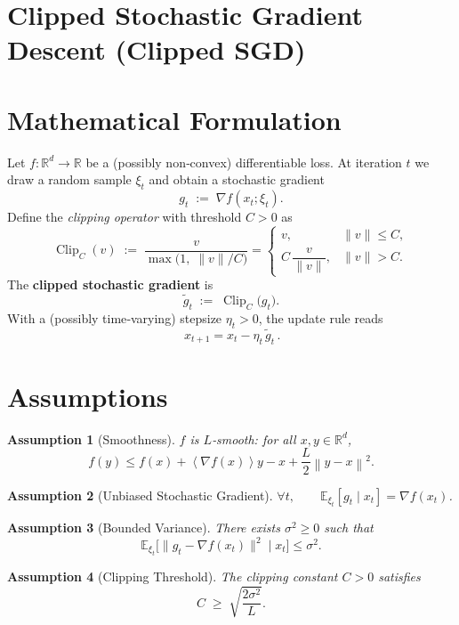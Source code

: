 \documentclass{article}
\newtheorem{assumption}{Assumption}
\newcommand{\E}{\mathbb{E}}
\newcommand{\norm}[1]{\left\lVert #1\right\rVert}
\newcommand{\inner}[1]{\left\langle #1\right\rangle}
\begin{document}
\section*{Clipped Stochastic Gradient Descent (Clipped SGD)}

\section*{Mathematical Formulation}
Let $f:\mathbb{R}^{d}\to\mathbb{R}$ be a (possibly non‑convex) differentiable loss.  
At iteration $t$ we draw a random sample $\xi_t$ and obtain a stochastic gradient
\[
g_t \;:=\; \nabla f(x_t;\xi_t) .
\]
Define the \emph{clipping operator} with threshold $C>0$ as
\[
\operatorname{Clip}_C(v)\;:=\;
\frac{v}{\max\!\bigl(1,\; \|v\|/C\bigr)}=
\begin{cases}
v, & \|v\|\le C,\\[4pt]
C\,\dfrac{v}{\|v\|}, & \|v\|>C .
\end{cases}
\]
The \textbf{clipped stochastic gradient} is
\[
\tilde g_t \;:=\; \operatorname{Clip}_C\!\bigl(g_t\bigr).
\]
With a (possibly time‑varying) stepsize $\eta_t>0$, the update rule reads
\[
\boxed{\,x_{t+1}=x_t-\eta_t\,\tilde g_t\,}. \tag{1}
\]

\section*{Assumptions}
\begin{assumption}[Smoothness]\label{as:smooth}
$f$ is $L$‑smooth: for all $x,y\in\mathbb{R}^d$,
\[
f(y)\le f(x)+\inner{\nabla f(x)}{y-x}+\frac{L}{2}\norm{y-x}^2 .
\]
\end{assumption}
\begin{assumption}[Unbiased Stochastic Gradient]\label{as:unbiased}
$\displaystyle\forall t,\qquad \E_{\xi_t}[g_t\mid x_t]=\nabla f(x_t)$.
\end{assumption}
\begin{assumption}[Bounded Variance]\label{as:variance}
There exists $\sigma^2\ge0$ such that
\[
\E_{\xi_t}\!\bigl[\|g_t-\nabla f(x_t)\|^2\mid x_t\bigr]\le\sigma^2 .
\]
\end{assumption}
\begin{assumption}[Clipping Threshold]\label{as:threshold}
The clipping constant $C>0$ satisfies
\[
C\;\ge\;\sqrt{\frac{2\sigma^2}{L}} .
\]
\end{assumption}
\end{document}
